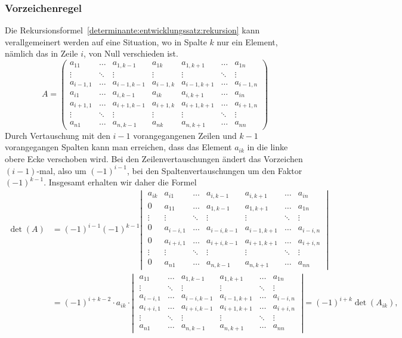 \subsubsection{Vorzeichenregel}
Die Rekursionsformel~\eqref{determinante:entwicklungssatz:rekursion}
kann verallgemeinert werden auf eine Situation, wo in Spalte $k$
nur ein Element, nämlich das in Zeile $i$, von Null verschieden ist.
\[
A=
\begin{pmatrix}
a_{  1 1}&\dots &a_{  1,k-1}&a_{  1 k}&a_{  1,k+1}&\dots &a_{  1 n}\\
\vdots   &\ddots&\vdots     &\vdots   &\vdots     &\ddots&\vdots   \\
a_{i-1,1}&\dots &a_{i-1,k-1}&a_{i-1,k}&a_{i-1,k+1}&\dots &a_{i-1,n}\\
a_{  i 1}&\dots &a_{  i,k-1}&a_{  i k}&a_{  i,k+1}&\dots &a_{  i n}\\
a_{i+1,1}&\dots &a_{i+1,k-1}&a_{i+1,k}&a_{i+1,k+1}&\dots &a_{i+1,n}\\
\vdots   &\ddots&\vdots     &\vdots   &\vdots     &\ddots&\vdots   \\
a_{  n 1}&\dots &a_{  n,k-1}&a_{  n k}&a_{  n,k+1}&\dots &a_{  n n}
\end{pmatrix}
\]
Durch Vertauschung mit den $i-1$ vorangegangenen Zeilen und $k-1$
vorangegangen Spalten kann man erreichen, dass das Element $a_{ik}$
in die linke obere Ecke verschoben wird.
Bei den Zeilenvertauschungen ändert das Vorzeichen $(i-1)$-mal, also
um $(-1)^{i-1}$, bei den Spaltenvertauschungen um den Faktor $(-1)^{k-1}$.
Insgesamt erhalten wir daher die Formel
\begin{align*}
\det(A)
&=
(-1)^{i-1}(-1)^{k-1}
\left|\;\begin{matrix}
a_{ik}&a_{  i 1}&\dots &a_{  i,k-1}&a_{  i,k+1}&\dots &a_{  i n}\\
  0   &a_{  1 1}&\dots &a_{  1,k-1}&a_{  1,k+1}&\dots &a_{  1 n}\\
\vdots&\vdots   &\ddots&\vdots     &\vdots     &\ddots&\vdots   \\
  0   &a_{i-i,1}&\dots &a_{i-i,k-1}&a_{i-1,k+1}&\dots &a_{i-i,n}\\
  0   &a_{i+i,1}&\dots &a_{i+i,k-1}&a_{i+1,k+1}&\dots &a_{i+i,n}\\
\vdots&\vdots   &\ddots&\vdots     &\vdots     &\ddots&\vdots   \\
  0   &a_{  n 1}&\dots &a_{  n,k-1}&a_{  n,k+1}&\dots &a_{  n n}
\end{matrix}\;\right|
\\
&=
(-1)^{i+k-2}
\cdot
a_{ik}
\cdot
\left|\;\begin{matrix}
a_{  1 1}&\dots &a_{  1,k-1}&a_{  1,k+1}&\dots &a_{  1 n}\\
\vdots   &\ddots&\vdots     &\vdots     &\ddots&\vdots   \\
a_{i-i,1}&\dots &a_{i-i,k-1}&a_{i-1,k+1}&\dots &a_{i-i,n}\\
a_{i+i,1}&\dots &a_{i+i,k-1}&a_{i+1,k+1}&\dots &a_{i+i,n}\\
\vdots   &\ddots&\vdots     &\vdots     &\ddots&\vdots   \\
a_{  n 1}&\dots &a_{  n,k-1}&a_{  n,k+1}&\dots &a_{  n n}
\end{matrix}\;\right|
=
(-1)^{i+k}\det(A_{ik}),
\end{align*}
